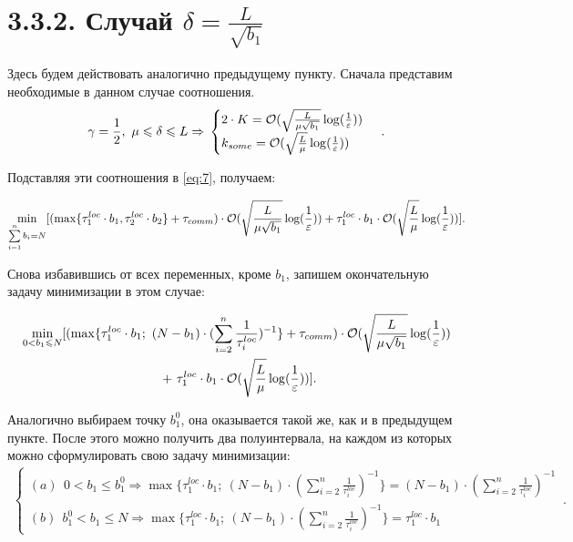 \documentclass{article}
\theoremstyle{definition}
\theoremstyle{plain}
\begin{document}
\section*{3.3.2. Случай $\delta = \frac{L}{\sqrt{b_1}}$}
Здесь будем действовать аналогично предыдущему пункту. Сначала представим необходимые в данном случае соотношения.
\begin{equation}
    \notag
    \gamma = \frac{1}{2},~ \mu \leq \delta \leq L \Rightarrow 
    \\
    \notag
    \begin{cases}
      2\cdot K = \mathcal O(\sqrt{\frac{L}{\mu \sqrt{b_1}}}\log(\frac{1}{\varepsilon}))\\
      k_{some} = \mathcal O(\sqrt{\frac{L}{\mu}}\log(\frac{1}{\varepsilon}))
    \end{cases}\,.
\end{equation}

Подставляя эти соотношения в \eqref{eq:7}, получаем:

\begin{equation}
    \notag
    \underset{\sum\limits_{i = 1}^{n} b_i = N}{\min}[(\max\{\tau_1^{loc}\cdot b_1, \tau_2^{loc}\cdot b_2\} + \tau_{comm}) \cdot \mathcal O(\sqrt{\frac{L}{\mu \sqrt{b_1}}}\log(\frac{1}{\varepsilon})) + \tau_1^{loc}\cdot b_1 \cdot \mathcal O(\sqrt{\frac{L}{\mu}}\log(\frac{1}{\varepsilon}))].
\end{equation}

Снова избавившись от всех переменных, кроме $b_1$, запишем окончательную задачу минимизации в этом случае:

\begin{eqnarray}
    \begin{split}
    \label{eq:fm2}
        \underset{0 < b_1 \leq N}{\min}[(\max\{\tau_1^{loc}\cdot b_1; ~(N-b_1) \cdot (\sum\limits_{i = 2}^{n} \frac{1}{\tau_i^{loc}} )^{-1}\} + \tau_{comm}) \cdot \mathcal O(\sqrt{\frac{L}{\mu \sqrt{b_1}}}\log(\frac{1}{\varepsilon}))
        \\ + ~
        \tau_1^{loc}\cdot b_1 \cdot \mathcal O(\sqrt{\frac{L}{\mu}}\log(\frac{1}{\varepsilon}))]. \hspace{3.7cm}
    \end{split}
\end{eqnarray}

Аналогично выбираем точку $b_1^0$, она оказывается такой же, как и в предыдущем пункте. После этого можно получить два полуинтервала, на каждом из которых можно сформулировать свою задачу минимизации:
\begin{eqnarray*}
    \begin{cases}
    (a) ~ ~ 0 < b_1 \leq b_1^0 \Rightarrow \max\{\tau_1^{loc}\cdot b_1; ~(N-b_1) \cdot (\sum\limits_{i = 2}^{n} \frac{1}{\tau_i^{loc}} )^{-1}\} = 
    (N-b_1) \cdot (\sum\limits_{i = 2}^{n} \frac{1}{\tau_i^{loc}})^{-1}
    \\
    (b) ~ ~ b_1^0 <  b_1 \leq N \Rightarrow \max\{\tau_1^{loc}\cdot b_1; ~(N-b_1) \cdot (\sum\limits_{i = 2}^{n} \frac{1}{\tau_i^{loc}} )^{-1}\} = \tau_1^{loc}\cdot b_1
    \end{cases}\,.
\end{eqnarray*}
\end{document}
